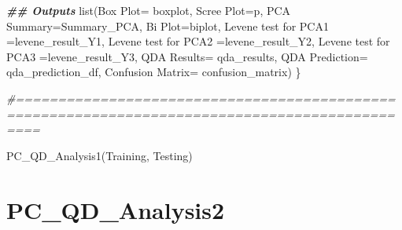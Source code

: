 \documentclass[
]{article}
\newenvironment{Shaded}{\begin{snugshade}}{\end{snugshade}}
\newcommand{\AttributeTok}[1]{\textcolor[rgb]{0.77,0.63,0.00}{#1}}
\newcommand{\CommentTok}[1]{\textcolor[rgb]{0.56,0.35,0.01}{\textit{#1}}}
\newcommand{\DocumentationTok}[1]{\textcolor[rgb]{0.56,0.35,0.01}{\textbf{\textit{#1}}}}
\newcommand{\FunctionTok}[1]{\textcolor[rgb]{0.00,0.00,0.00}{#1}}
\newcommand{\NormalTok}[1]{#1}
\newcommand{\OtherTok}[1]{\textcolor[rgb]{0.56,0.35,0.01}{#1}}
\newcommand{\StringTok}[1]{\textcolor[rgb]{0.31,0.60,0.02}{#1}}
\begin{document}
\begin{Shaded}
\begin{Highlighting}[]
  \DocumentationTok{\#\# Outputs}
  \FunctionTok{list}\NormalTok{(}\StringTok{\textasciigrave{}}\AttributeTok{Box Plot}\StringTok{\textasciigrave{}}\OtherTok{=}\NormalTok{  boxplot, }\StringTok{\textasciigrave{}}\AttributeTok{Scree Plot}\StringTok{\textasciigrave{}}\OtherTok{=}\NormalTok{p, }\StringTok{\textasciigrave{}}\AttributeTok{PCA Summary}\StringTok{\textasciigrave{}}\OtherTok{=}\NormalTok{Summary\_PCA, }\StringTok{\textasciigrave{}}\AttributeTok{Bi Plot}\StringTok{\textasciigrave{}}\OtherTok{=}\NormalTok{biplot, }\StringTok{\textasciigrave{}}\AttributeTok{Levene test for PCA1}\StringTok{\textasciigrave{}} \OtherTok{=}\NormalTok{levene\_result\_Y1,}
       \StringTok{\textasciigrave{}}\AttributeTok{Levene test for PCA2}\StringTok{\textasciigrave{}} \OtherTok{=}\NormalTok{levene\_result\_Y2, }\StringTok{\textasciigrave{}}\AttributeTok{Levene test for PCA3}\StringTok{\textasciigrave{}} \OtherTok{=}\NormalTok{levene\_result\_Y3,}
       \StringTok{\textasciigrave{}}\AttributeTok{QDA Results}\StringTok{\textasciigrave{}}\OtherTok{=}\NormalTok{ qda\_results, }\StringTok{\textasciigrave{}}\AttributeTok{QDA Prediction}\StringTok{\textasciigrave{}}\OtherTok{=}\NormalTok{ qda\_prediction\_df, }\StringTok{\textasciigrave{}}\AttributeTok{Confusion Matrix}\StringTok{\textasciigrave{}}\OtherTok{=}\NormalTok{ confusion\_matrix)}
\NormalTok{\}}

\CommentTok{\#===============================================================================================}

\FunctionTok{PC\_QD\_Analysis1}\NormalTok{(Training, Testing)}
\end{Highlighting}
\end{Shaded}

\hypertarget{pc_qd_analysis2}{%
\section{PC\_QD\_Analysis2}\label{pc_qd_analysis2}}
\end{document}
